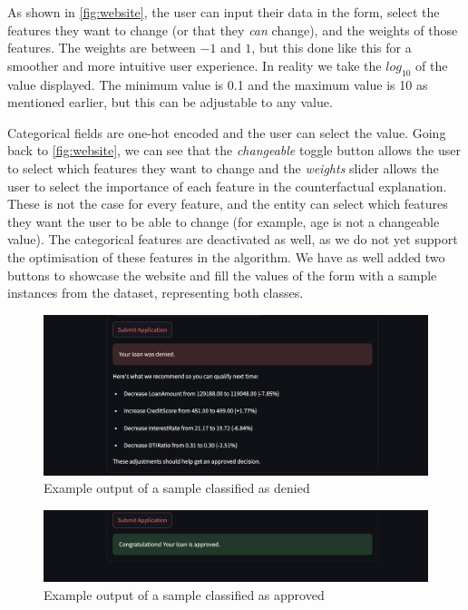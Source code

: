 \documentclass[12pt]{extarticle}
\numberwithin{equation}{section}
\begin{document}
As shown in \autoref{fig:website}, the user can input their data in the form, select the features they want to change (or that they \emph{can} change), and the weights of those features. The weights are between $-1$ and $1$, but this done like this for a smoother and more intuitive user experience. In reality we take the $log_{10}$ of the value displayed. The minimum value is 0.1 and the maximum value is 10 as mentioned earlier, but this can be adjustable to any value. 

Categorical fields are one-hot encoded and the user can select the value. Going back to \autoref{fig:website}, we can see that the \emph{changeable} toggle button allows the user to select which features they want to change and the \emph{weights} slider allows the user to select the importance of each feature in the counterfactual explanation. These is not the case for every feature, and the entity can select which features they want the user to be able to change (for example, age is not a changeable value). The categorical features are deactivated as well, as we do not yet support the optimisation of these features in the algorithm. We have as well added two buttons to showcase the website and fill the values of the form with a sample instances from the dataset, representing both classes.

\begin{figure}[H]
    \centering
    \includegraphics[width=1\textwidth]{images/website_output_denied}
    \caption{Example output of a sample classified as denied}
    \label{fig:website_output_denied}
\end{figure}
\begin{figure}[H]
    \centering
    \includegraphics[width=1\textwidth]{images/website_output_approved}
    \caption{Example output of a sample classified as approved}
    \label{fig:website_output_approved}
\end{figure}
\end{document}
